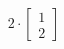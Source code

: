 \documentclass[preview]{standalone}
\begin{document}
\begin{align*}
2 \cdot \begin{bmatrix} 1 \\ 2 \end{bmatrix}
\end{align*}
\end{document}
